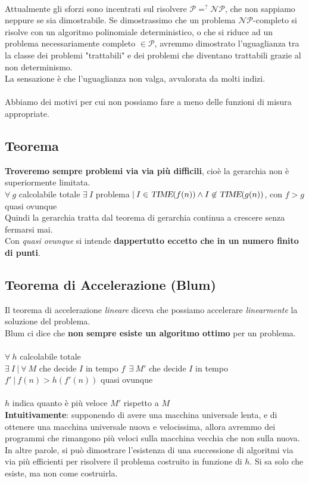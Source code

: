 \documentclass[10pt]{book}
\begin{document}
\paragraph{} Attualmente gli sforzi sono incentrati sul risolvere $\mathscr{P} =^? \mathscr{NP}$, che non sappiamo neppure se sia dimostrabile. Se dimostrassimo che un problema $\mathscr{NP}$-completo si risolve con un algoritmo polinomiale deterministico, o che si riduce ad un problema necessariamente completo $\in\mathscr{P}$, avremmo dimostrato l'uguaglianza tra la classe dei problemi "trattabili" e dei problemi che diventano trattabili grazie al non determinismo.\\
La sensazione è che l'uguaglianza non valga, avvalorata da molti indizi. 
\paragraph{} Abbiamo dei motivi per cui non possiamo fare a meno delle funzioni di misura appropriate.
\subsection{Teorema} \textbf{Troveremo sempre problemi via via più difficili}, cioè la gerarchia non è superiormente limitata.\\
$\forall\:g$ calcolabile totale $\exists\:I$ problema$\:|\:I\in\textsl{TIME}(f(n))\wedge I\not\in\textsl{TIME}(g(n))$, con $f > g$ quasi ovunque\\
Quindi la gerarchia tratta dal teorema di gerarchia continua a crescere senza fermarsi mai.\\
Con \textit{quasi ovunque} si intende \textbf{dappertutto eccetto che in un numero finito di punti}.
\subsection{Teorema di Accelerazione (Blum)} Il teorema di accelerazione \textit{lineare} diceva che possiamo accelerare \textit{linearmente} la soluzione del problema.\\
Blum ci dice che \textbf{non sempre esiste un algoritmo ottimo} per un problema.\\\\
$\forall\:h$ calcolabile totale\\
$\exists\:I\:|\:\forall\:M$ che decide $I$ in tempo $f\:\:\exists\:M'$ che decide $I$ in tempo $f'\:|\:f(n)>h(f'(n))$ quasi ovunque\\\\
$h$ indica quanto è più veloce $M'$ rispetto a $M$\\
\textbf{Intuitivamente}: supponendo di avere una macchina universale lenta, e di ottenere una macchina universale nuova e velocissima, allora avremmo dei programmi che rimangono più veloci sulla macchina vecchia che non sulla nuova.\\
In altre parole, si può dimostrare l'esistenza di una successione di algoritmi via via più efficienti per risolvere il problema costruito in funzione di $h$. Si sa solo che esiste, ma non come costruirla.
\end{document}
